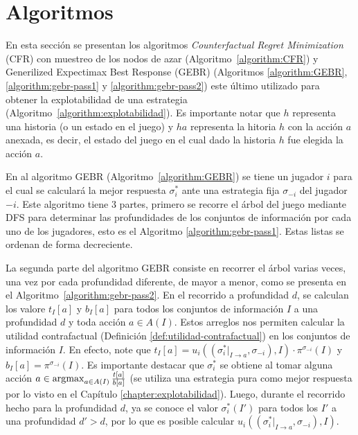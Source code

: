 \chapter{Algoritmos}
\label{apex:chapter:algoritmos}
\algnewcommand{\OR}{\algorithmicor}
\algnewcommand{\AND}{\algorithmicand}

En esta sección se presentan los algoritmos \textit{Counterfactual Regret Minimization} (CFR) con muestreo de los nodos de azar (Algoritmo~\ref{algorithm:CFR}) y Generilized Expectimax Best Response (GEBR) (Algoritmos \ref{algorithm:GEBR}, \ref{algorithm:gebr-pass1} y \ref{algorithm:gebr-pass2}) este último utilizado para obtener la explotabilidad de una estrategia (Algoritmo~\ref{algorithm:explotabilidad}). Es importante notar que $h$ representa una historia (o un estado en el juego) y $ha$ representa la hitoria $h$ con la acción $a$ anexada, es decir, el estado del juego en el cual dado la historia $h$ fue elegida la acción $a$.

En al algoritmo GEBR (Algoritmo~\ref{algorithm:GEBR}) se tiene un jugador $i$ para el cual se calculará la mejor respuesta $\sigma^*_i$ ante una estrategia fija $\sigma_{-i}$ del jugador $-i$. Este algoritmo tiene $3$ partes, primero se recorre el árbol del juego mediante DFS para determinar las profundidades de los conjuntos de información por cada uno de los jugadores, esto es el Algoritmo \ref{algorithm:gebr-pass1}. Estas listas se ordenan de forma decreciente.

La segunda parte del algoritmo GEBR consiste en recorrer el árbol varias veces, una vez por cada profundidad diferente, de mayor a menor, como se presenta en el Algoritmo~\ref{algorithm:gebr-pass2}. En el recorrido a profundidad $d$, se calculan los valore $t_I[a]$ y $b_I[a]$ para todos los conjuntos de información $I$ a una profundidad $d$ y toda acción $a \in A(I)$. Estos arreglos nos permiten calcular la utilidad contrafactual (Definición \ref{def:utilidad-contrafactual}) en los conjuntos de información $I$. En efecto, note que $t_I[a] = u_i((\sigma^*_i|_{I \rightarrow a}, \sigma_{-i}),I) \cdot \pi^{\sigma_{-i}}(I)$ y $b_I[a] = \pi^{\sigma_{-i}}(I)$. Es importante destacar que $\sigma^*_i$ se obtiene al tomar alguna acción $a \in  \operatorname*{\arg\!\max}_{a \in A(I)} \frac{t[a]}{b[a]}$ (se utiliza una estrategia pura como mejor respuesta por lo visto en el Capítulo \ref{chapter:explotabilidad}). Luego, durante el recorrido hecho para la profundidad $d$, ya se conoce el valor $\sigma^*_i(I')$ para todos los $I'$ a una profundidad $d' > d$, por lo que es posible calcular  $u_i((\sigma^*_i|_{I \rightarrow a}, \sigma_{-i}),I)$.

